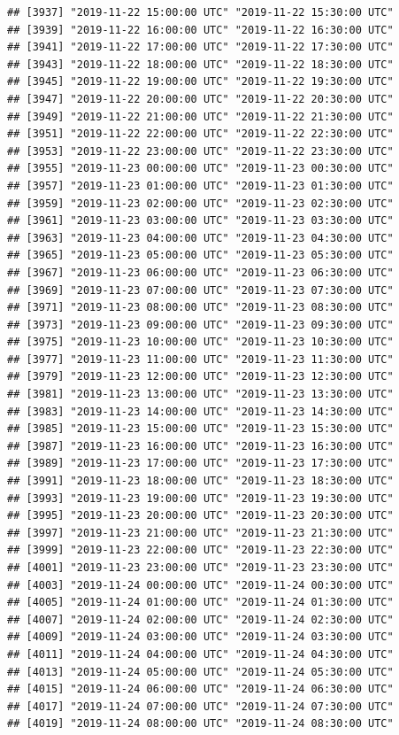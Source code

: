 \documentclass{article}\usepackage[]{graphicx}\usepackage[]{color}
\makeatletter
\newenvironment{kframe}{%
 \def\at@end@of@kframe{}%
 \ifinner\ifhmode%
  \def\at@end@of@kframe{\end{minipage}}%
  \begin{minipage}{\columnwidth}%
 \fi\fi%
 \def\FrameCommand##1{\hskip\@totalleftmargin \hskip-\fboxsep
 \colorbox{shadecolor}{##1}\hskip-\fboxsep
     \hskip-\linewidth \hskip-\@totalleftmargin \hskip\columnwidth}%
 \MakeFramed {\advance\hsize-\width
   \@totalleftmargin\z@ \linewidth\hsize
   \@setminipage}}%
 {\par\unskip\endMakeFramed%
 \at@end@of@kframe}
\newenvironment{knitrout}{}{} %
\makeatother
\begin{document}
\begin{knitrout}
\begin{kframe}
\begin{verbatim}
## [3937] "2019-11-22 15:00:00 UTC" "2019-11-22 15:30:00 UTC"
## [3939] "2019-11-22 16:00:00 UTC" "2019-11-22 16:30:00 UTC"
## [3941] "2019-11-22 17:00:00 UTC" "2019-11-22 17:30:00 UTC"
## [3943] "2019-11-22 18:00:00 UTC" "2019-11-22 18:30:00 UTC"
## [3945] "2019-11-22 19:00:00 UTC" "2019-11-22 19:30:00 UTC"
## [3947] "2019-11-22 20:00:00 UTC" "2019-11-22 20:30:00 UTC"
## [3949] "2019-11-22 21:00:00 UTC" "2019-11-22 21:30:00 UTC"
## [3951] "2019-11-22 22:00:00 UTC" "2019-11-22 22:30:00 UTC"
## [3953] "2019-11-22 23:00:00 UTC" "2019-11-22 23:30:00 UTC"
## [3955] "2019-11-23 00:00:00 UTC" "2019-11-23 00:30:00 UTC"
## [3957] "2019-11-23 01:00:00 UTC" "2019-11-23 01:30:00 UTC"
## [3959] "2019-11-23 02:00:00 UTC" "2019-11-23 02:30:00 UTC"
## [3961] "2019-11-23 03:00:00 UTC" "2019-11-23 03:30:00 UTC"
## [3963] "2019-11-23 04:00:00 UTC" "2019-11-23 04:30:00 UTC"
## [3965] "2019-11-23 05:00:00 UTC" "2019-11-23 05:30:00 UTC"
## [3967] "2019-11-23 06:00:00 UTC" "2019-11-23 06:30:00 UTC"
## [3969] "2019-11-23 07:00:00 UTC" "2019-11-23 07:30:00 UTC"
## [3971] "2019-11-23 08:00:00 UTC" "2019-11-23 08:30:00 UTC"
## [3973] "2019-11-23 09:00:00 UTC" "2019-11-23 09:30:00 UTC"
## [3975] "2019-11-23 10:00:00 UTC" "2019-11-23 10:30:00 UTC"
## [3977] "2019-11-23 11:00:00 UTC" "2019-11-23 11:30:00 UTC"
## [3979] "2019-11-23 12:00:00 UTC" "2019-11-23 12:30:00 UTC"
## [3981] "2019-11-23 13:00:00 UTC" "2019-11-23 13:30:00 UTC"
## [3983] "2019-11-23 14:00:00 UTC" "2019-11-23 14:30:00 UTC"
## [3985] "2019-11-23 15:00:00 UTC" "2019-11-23 15:30:00 UTC"
## [3987] "2019-11-23 16:00:00 UTC" "2019-11-23 16:30:00 UTC"
## [3989] "2019-11-23 17:00:00 UTC" "2019-11-23 17:30:00 UTC"
## [3991] "2019-11-23 18:00:00 UTC" "2019-11-23 18:30:00 UTC"
## [3993] "2019-11-23 19:00:00 UTC" "2019-11-23 19:30:00 UTC"
## [3995] "2019-11-23 20:00:00 UTC" "2019-11-23 20:30:00 UTC"
## [3997] "2019-11-23 21:00:00 UTC" "2019-11-23 21:30:00 UTC"
## [3999] "2019-11-23 22:00:00 UTC" "2019-11-23 22:30:00 UTC"
## [4001] "2019-11-23 23:00:00 UTC" "2019-11-23 23:30:00 UTC"
## [4003] "2019-11-24 00:00:00 UTC" "2019-11-24 00:30:00 UTC"
## [4005] "2019-11-24 01:00:00 UTC" "2019-11-24 01:30:00 UTC"
## [4007] "2019-11-24 02:00:00 UTC" "2019-11-24 02:30:00 UTC"
## [4009] "2019-11-24 03:00:00 UTC" "2019-11-24 03:30:00 UTC"
## [4011] "2019-11-24 04:00:00 UTC" "2019-11-24 04:30:00 UTC"
## [4013] "2019-11-24 05:00:00 UTC" "2019-11-24 05:30:00 UTC"
## [4015] "2019-11-24 06:00:00 UTC" "2019-11-24 06:30:00 UTC"
## [4017] "2019-11-24 07:00:00 UTC" "2019-11-24 07:30:00 UTC"
## [4019] "2019-11-24 08:00:00 UTC" "2019-11-24 08:30:00 UTC"

\end{verbatim}
\end{kframe}
\end{knitrout}
\end{document}
